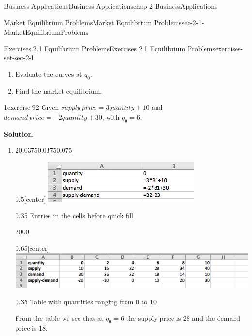\documentclass[oneside,10pt,]{book}
\numberwithin{equation}{section}
\begin{document}
\begin{chapterptx}{Business Applications}{}{Business Applications}{}{}{chap-2-BusinessApplications}
\begin{sectionptx}{Market Equilibrium Problems}{}{Market Equilibrium Problems}{}{}{sec-2-1-MarketEquilibriumProblems}
\begin{exercises-subsection-numberless}{Exercises 2.1 Equilibrium Problems}{}{Exercises 2.1 Equilibrium Problems}{}{}{exercises-set-sec-2-1}
\begin{enumerate}[label=(\alph*)]
\item\hypertarget{li-164}{}\hypertarget{p-586}{}%
Evaluate the curves at \(q_0\).%
\item\hypertarget{li-165}{}\hypertarget{p-587}{}%
Find the market equilibrium.%
\end{enumerate}
\begin{exercisegroup}
\begin{divisionexerciseeg}{1}{}{}{exercise-92}%
\hypertarget{p-588}{}%
Given \(supply\ price=3 quantity+10\) and \(demand\ price=-2 quantity+30\), with \(q_0=6\).%
\par\smallskip%
\noindent\textbf{Solution}.\hypertarget{solution-44}{}\quad%
\leavevmode%
\begin{enumerate}[label=(\alph*)]
\item\hypertarget{li-166}{}\hypertarget{p-589}{}%
\leavevmode%
\begin{sidebyside}{2}{0.0375}{0.0375}{0.075}%
\begin{sbspanel}{0.5}[center]%
\includegraphics[width=1\linewidth]{images/sec2-1-sol1a.png}
\end{sbspanel}%
\begin{sbspanel}{0.35}%
\hypertarget{p-590}{}%
Entries in the cells before quick fill%
\end{sbspanel}%
\end{sidebyside}%
 \begin{sidebyside}{2}{0}{0}{0}%
\begin{sbspanel}{0.65}[center]%
\includegraphics[width=1\linewidth]{images/sec2-1-sol1b.png}
\end{sbspanel}%
\begin{sbspanel}{0.35}%
\hypertarget{p-591}{}%
Table with quantities ranging from 0 to 10%
\end{sbspanel}%
\end{sidebyside}%
 From the table we see that at \(q_0=6\) the supply price is \textdollar{}28 and the demand price is \textdollar{}18.%

\end{enumerate}
\end{divisionexerciseeg}
\end{exercisegroup}
\end{exercises-subsection-numberless}
\end{sectionptx}
\end{chapterptx}
\end{document}
